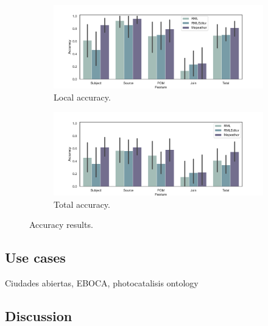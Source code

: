 \begin{figure}[t!]
    \centering
    \begin{subfigure}[b]{\linewidth}
    	\includegraphics[width=\linewidth]{figures/mapeathor_rel-acc.pdf}
    	\caption{Local accuracy.}
    	\label{fig:chp5_mapeathor_relacc}
    \end{subfigure}
    \begin{subfigure}[b]{\linewidth}
    	\includegraphics[width=\linewidth]{figures/mapeathor_total-acc.pdf}
    	\caption{Total accuracy.}
    	\label{fig:chp5_mapeathor_totacc}
    \end{subfigure}
    \caption{Accuracy results.}
    \label{fig:reification-app}
\end{figure}


\subsection{Use cases}
Ciudades abiertas, EBOCA, photocatalisis ontology



\subsection{Discussion}
\label{sec:chp5_mapeathor_discussion}

\newpage